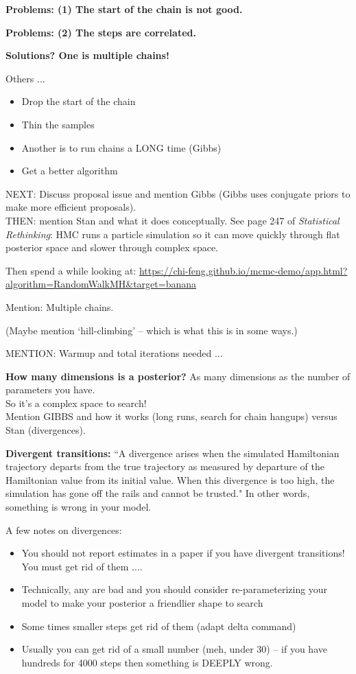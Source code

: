 \documentclass[11pt]{article}
\begin{document}
{\bf Problems: (1) The start of the chain is not good.}

{\bf Problems: (2) The steps are correlated.}

{\bf Solutions? One is multiple chains!} 

Others ... 
\begin{itemize}
\item Drop the start of the chain
\item Thin the samples
\item Another is to run chains a LONG time (Gibbs)
\item Get a better algorithm
\end{itemize}

NEXT: Discuss proposal issue and mention Gibbs (Gibbs uses conjugate priors to make more efficient proposals).\\ %

THEN: mention Stan and what it does conceptually. See page 247 of \emph{Statistical Rethinking}: HMC runs a particle simulation so it can move quickly through flat posterior space and slower through complex space. 

Then spend a while looking at: \url{https://chi-feng.github.io/mcmc-demo/app.html?algorithm=RandomWalkMH&target=banana}

Mention: Multiple chains. 

(Maybe mention `hill-climbing' -- which is what this is in some ways.)

MENTION: Warmup and total iterations needed ... 

{\bf How many dimensions is a posterior?} As many dimensions as the number of parameters you have. \\
So it's a complex space to search! \\

Mention GIBBS and how it works (long runs, search for chain hangups) versus Stan (divergences).

{\bf Divergent transitions:} ``A divergence arises when the simulated Hamiltonian trajectory departs from the true trajectory as measured by departure of the Hamiltonian value from its initial value. When this divergence is too high, the simulation has gone off the rails and cannot be trusted." In other words, something is wrong in your model.  %

A few notes on divergences:
\begin{itemize}
\item You should not report estimates in a paper if you have divergent transitions! You must get rid of them ....
\item Technically, any are bad and you should consider re-parameterizing your model to make your posterior a friendlier shape to search
\item Some times smaller steps get rid of them (adapt delta command)
\item Usually you can get rid of a small number (meh, under 30) -- if you have hundreds for 4000 steps then something is DEEPLY wrong. 
\end{itemize}
\end{document}

